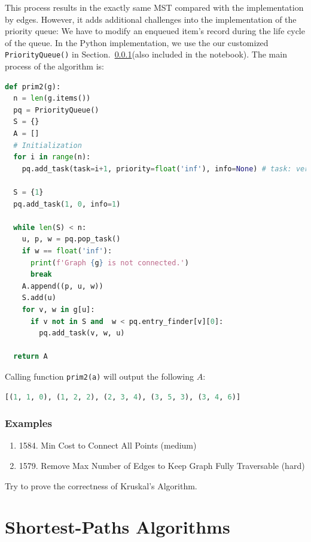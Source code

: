 \documentclass[../main.tex]{subfiles}
\begin{document}
 This process results in the exactly same MST compared with the implementation by edges. However, it adds additional challenges into the implementation of the priority queue: We have to modify an enqueued item's record during the life cycle of the queue. In the Python implementation, we use the our customized \texttt{PriorityQueue()} in Section.~\ref{}(also included in the notebook). The main process of the algorithm is:
 \begin{lstlisting}[language=Python]
def prim2(g):  
  n = len(g.items())
  pq = PriorityQueue()
  S = {}
  A = []
  # Initialization
  for i in range(n):
    pq.add_task(task=i+1, priority=float('inf'), info=None) # task: vertex, priority: edge cost, info: predecessor vertex
  
  S = {1}
  pq.add_task(1, 0, info=1)

  while len(S) < n:
    u, p, w = pq.pop_task()
    if w == float('inf'):
      print(f'Graph {g} is not connected.')
      break
    A.append((p, u, w))
    S.add(u)
    for v, w in g[u]:
      if v not in S and  w < pq.entry_finder[v][0]:
        pq.add_task(v, w, u)
  
  return A
 \end{lstlisting}
 Calling function \texttt{prim2(a)} will output the following $A$:
 \begin{lstlisting}[language=Python]
 [(1, 1, 0), (1, 2, 2), (2, 3, 4), (3, 5, 3), (3, 4, 6)]
 \end{lstlisting}
 
 \subsubsection{Examples}
 \begin{enumerate}
     \item 1584. Min Cost to Connect All Points (medium)
     \item 1579. Remove Max Number of Edges to Keep Graph Fully Traversable (hard)
 \end{enumerate}

\begin{bclogo}[couleur = blue!30, arrondi=0.1,logo=\bccrayon,ombre=true]{Try to prove the correctness of Kruskal's Algorithm.} 
\end{bclogo}


 
\section{Shortest-Paths Algorithms}
\label{sec_single_source_shortest_paths}
\end{document}
